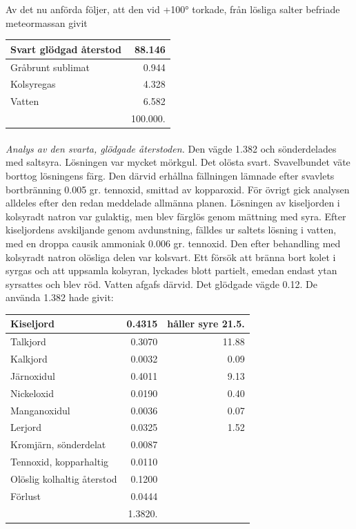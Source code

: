 \documentclass[a4paper, 12pt, oneside, swedish]{article}
\begin{document}
Av det nu anförda följer, att den vid +100° torkade, från lösliga salter befriade meteormassan givit
\begin{table}[H]
    \centering\small
    \begin{tabular}{|l|r|}
    \hline
        Svart glödgad återstod & 88.146 \\ \hline
        Gråbrunt sublimat & 0.944 \\ \hline
        Kolsyregas & 4.328 \\ \hline
        Vatten & 6.582 \\ \hline
        ~ & 100.000. \\ \hline
    \end{tabular}
\end{table}
\paragraph{}
\emph{Analys av den svarta, glödgade återstoden.} Den vägde 1.382 och sönderdelades med saltsyra. Lösningen var mycket mörkgul. Det olösta svart. Svavelbundet väte borttog lösningens färg. Den därvid erhållna fällningen lämnade efter svavlets bortbränning 0.005 gr. tennoxid, smittad av kopparoxid. För övrigt gick analysen alldeles efter den redan meddelade allmänna planen. Lösningen av kiseljorden i kolsyradt natron var gulaktig, men blev färglös genom mättning med syra. Efter kiseljordens avskiljande genom avdunstning, fälldes ur saltets lösning i vatten, med en droppa causik ammoniak 0.006 gr. tennoxid. Den efter behandling med kolsyradt natron olösliga delen var kolsvart. Ett försök att bränna bort kolet i syrgas och att uppsamla kolsyran, lyckades blott partielt, emedan endast ytan syrsattes och blev röd. Vatten afgafs därvid. Det glödgade vägde 0.12. De använda 1.382 hade givit:
\begin{table}[H]
    \centering\small
    \begin{tabular}{|l|r|r|}
    \hline
        Kiseljord & 0.4315 & håller syre 21.5. \\ \hline
        Talkjord & 0.3070 & 11.88 \\ \hline
        Kalkjord & 0.0032 & 0.09 \\ \hline
        Järnoxidul & 0.4011 & 9.13 \\ \hline
        Nickeloxid & 0.0190 & 0.40 \\ \hline
        Manganoxidul & 0.0036 & 0.07 \\ \hline
        Lerjord & 0.0325 & 1.52 \\ \hline
        Kromjärn, sönderdelat & 0.0087 & ~ \\ \hline
        Tennoxid, kopparhaltig & 0.0110 & ~ \\ \hline
        Olöslig kolhaltig återstod & 0.1200 & ~ \\ \hline
        Förlust & 0.0444 & ~ \\ \hline
        ~ & 1.3820. & ~ \\ \hline
    \end{tabular}
\end{table}
\end{document}
